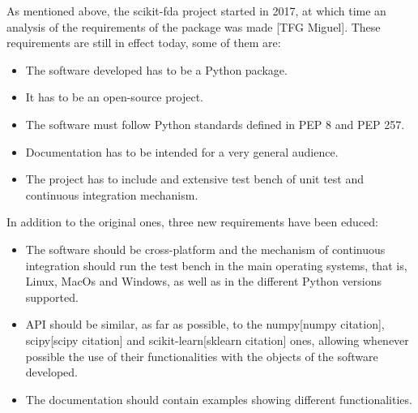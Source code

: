 
As mentioned above, the scikit-fda project started in 2017, at which time an
analysis of the requirements of the package was made [TFG Miguel]. These
requirements are still in effect today, some of them are:

\begin{itemize}
\item The software developed has to be a Python package.
\item It has to be an open-source project.
\item The software must follow Python standards defined in PEP 8 and PEP 257.
\item Documentation has to be intended for a very general audience.
\item The project has to include and extensive test bench of unit test and continuous integration mechanism.
\end{itemize}

In addition to the original ones, three new requirements have been educed:

\begin{itemize}
\item The software should be cross-platform and the mechanism of
 continuous integration should run the test bench in the main operating systems, that is, 
 Linux, MacOs and Windows, as well as in the different Python versions supported.
 
\item  API should be similar, as far as possible, to the numpy[numpy citation], scipy[scipy citation] and
 scikit-learn[sklearn citation] ones, allowing whenever possible the use of their functionalities with the
  objects of the software developed.
\item The documentation should contain examples showing different functionalities.
\end{itemize}
